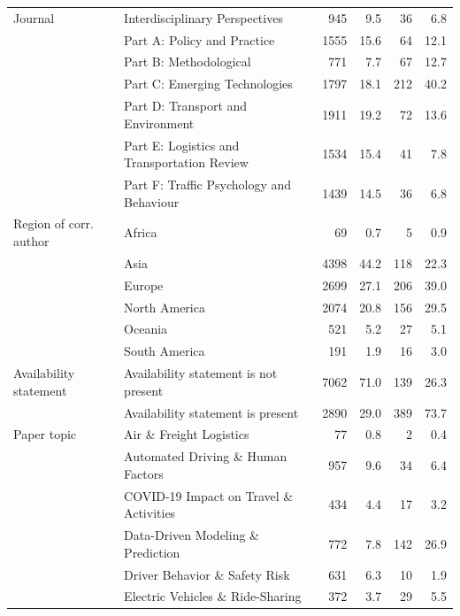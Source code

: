 \documentclass[
  authoryear,
  review,
  3p]{elsarticle}
\begin{document}
\begin{table}
{{\begin{tabular}[t]{llrrrr}
\midrule
Journal & Interdisciplinary Perspectives & \num{945} & \num{9.5} & \num{36} & \num{6.8}\\
 & Part A: Policy and Practice & \num{1555} & \num{15.6} & \num{64} & \num{12.1}\\
 & Part B: Methodological & \num{771} & \num{7.7} & \num{67} & \num{12.7}\\
 & Part C: Emerging Technologies & \num{1797} & \num{18.1} & \num{212} & \num{40.2}\\
 & Part D: Transport and Environment & \num{1911} & \num{19.2} & \num{72} & \num{13.6}\\
 & Part E: Logistics and Transportation Review & \num{1534} & \num{15.4} & \num{41} & \num{7.8}\\
 & Part F: Traffic Psychology and Behaviour & \num{1439} & \num{14.5} & \num{36} & \num{6.8}\\
\midrule
Region of corr. author & Africa & \num{69} & \num{0.7} & \num{5} & \num{0.9}\\
 & Asia & \num{4398} & \num{44.2} & \num{118} & \num{22.3}\\
 & Europe & \num{2699} & \num{27.1} & \num{206} & \num{39.0}\\
 & North America & \num{2074} & \num{20.8} & \num{156} & \num{29.5}\\
 & Oceania & \num{521} & \num{5.2} & \num{27} & \num{5.1}\\
 & South America & \num{191} & \num{1.9} & \num{16} & \num{3.0}\\
\midrule
Availability statement & Availability statement is not present & \num{7062} & \num{71.0} & \num{139} & \num{26.3}\\
 & Availability statement is present & \num{2890} & \num{29.0} & \num{389} & \num{73.7}\\
\midrule
Paper topic & Air \& Freight Logistics & \num{77} & \num{0.8} & \num{2} & \num{0.4}\\
 & Automated Driving \& Human Factors & \num{957} & \num{9.6} & \num{34} & \num{6.4}\\
 & COVID-19 Impact on Travel \& Activities & \num{434} & \num{4.4} & \num{17} & \num{3.2}\\
 & Data-Driven Modeling \& Prediction & \num{772} & \num{7.8} & \num{142} & \num{26.9}\\
 & Driver Behavior \& Safety Risk & \num{631} & \num{6.3} & \num{10} & \num{1.9}\\
 & Electric Vehicles \& Ride-Sharing & \num{372} & \num{3.7} & \num{29} & \num{5.5}\\

\end{tabular}}}
\end{table}
\end{document}
